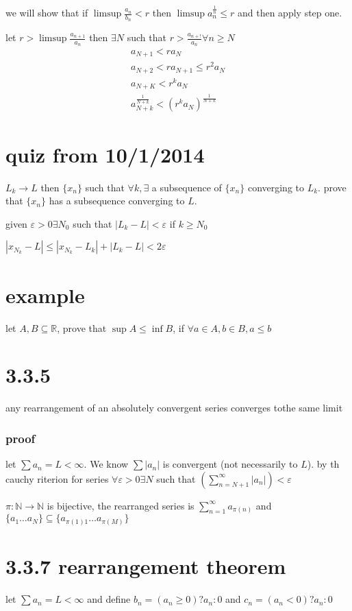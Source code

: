 \documentclass[letterpaper]{article}
\begin{document}
we will show that if $\limsup \frac{a_n}{b_n}<r$ then $\limsup a_n^{\frac{1}{n}}\le r$ and then apply step one.

let $r>\limsup \frac{a_{n+1}}{a_n}$ then $\exists N$ such that $r>\frac{a_{n+!}}{a_n}\forall n\ge N$
\begin{align*}
  a_{N+1}<ra_N\\
  a_{N+2}<ra_{N+1}\le r^2a_{N}\\
  a_{N+K}<r^{k}a_N\\
  a_{N+k}^{\frac{1}{N+k}}<(r^ka_N)^{\frac{1}{N+k}}
\end{align*}
\section*{quiz from 10/1/2014}
$L_k\to L$ then $\{x_n\}$ such that $\forall k, \exists$ a subsequence of $\{x_n\}$ converging to $L_k$. prove that $\{x_n\}$ has a subsequence converging to $L$.

given $\varepsilon>0\exists N_0$ such that $\left\lvert L_k-L\right\rvert<\varepsilon$ if $k\ge N_0$

$\left\lvert x_{N_k}-L\right\rvert\le\left\lvert x_{N_k}-L_k\right\rvert+\left\lvert L_k-L\right\rvert<2\varepsilon$

\section*{example}
let $A,B\subseteq \mathbb{R}$, prove that $\sup A\le\inf B$, if $\forall a\in A, b\in B, a\le b$

\section*{3.3.5}
any rearrangement of an absolutely convergent series converges tothe same limit
\subsubsection*{proof}
let $\sum\limits{a_n}=L<\infty$. We know $\sum\limits{|a_n|}$ is convergent (not necessarily to $L$). by th cauchy riterion for series $\forall\varepsilon>0\exists N$ such that $\left(\sum\limits_{n=N+1}^\infty{|a_n|}\right)<\varepsilon$

$\pi:\mathbb{N}\to\mathbb{N}$ is bijective, the rearranged series is $\sum\limits_{n=1}^{\infty}{a_{\pi(n)}}$ and $\{a_1\dots a_N\}\subseteq\{a_{\pi(1)1}\dots a_{\pi(M)}\}$

\section*{3.3.7 rearrangement theorem}
let $\sum\limits{a_n}=L<\infty$ and define $b_n=(a_n\ge 0)?a_n:0$ and $c_n=(a_n<0)?a_n:0$
\end{document}
